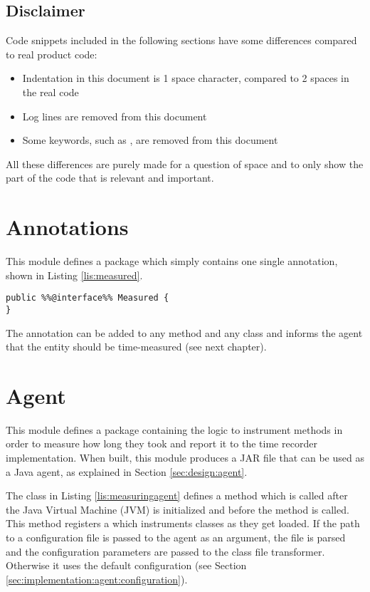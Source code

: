\subsection{Disclaimer}
Code snippets included in the following sections have some differences compared to real product code:
\begin{itemize}
  \item Indentation in this document is 1 space character, compared to 2 spaces in the real code
  \item Log lines are removed from this document
  \item Some keywords, such as , are removed from this document
\end{itemize}

\noindent All these differences are purely made for a question of space and to only show the part of the code that is relevant and important.

\section{Annotations}
\label{sec:implementation:annotations} 
This module defines a package  which simply contains one single annotation, shown in Listing \ref{lis:measured}.
\begin{lstlisting}[caption={Measured annotation},label=lis:measured]
public %%@interface%% Measured {
}
\end{lstlisting}

\noindent The annotation can be added to any method and any class and informs the agent that the entity should be time-measured (see next chapter).


\section{Agent}
This module defines a package  containing the logic to instrument methods in order to measure how long they took and report it to the time recorder implementation. When built, this module produces a JAR file that can be used as a Java agent, as explained in Section \ref{sec:design:agent}.

\noindent The  class in Listing \ref{lis:measuringagent} defines a  method which is called after the Java Virtual Machine (JVM) is initialized and before the  method is called. This method registers a  which instruments classes as they get loaded. If the path to a configuration file is passed to the agent as an argument, the file is parsed and the configuration parameters are passed to the class file transformer. Otherwise it uses the default configuration (see Section \ref{sec:implementation:agent:configuration}).

